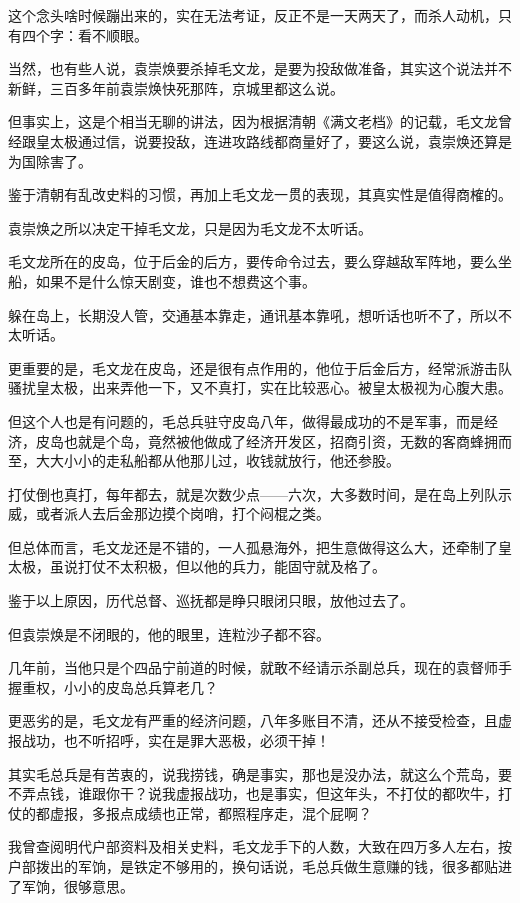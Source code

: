 \begin{multicols}{\theparacolNo}
		这个念头啥时候蹦出来的，实在无法考证，反正不是一天两天了，而杀人动机，只有四个字：看不顺眼。

		当然，也有些人说，袁崇焕要杀掉毛文龙，是要为投敌做准备，其实这个说法并不新鲜，三百多年前袁崇焕快死那阵，京城里都这么说。

		但事实上，这是个相当无聊的讲法，因为根据清朝《满文老档》的记载，毛文龙曾经跟皇太极通过信，说要投敌，连进攻路线都商量好了，要这么说，袁崇焕还算是为国除害了。

		鉴于清朝有乱改史料的习惯，再加上毛文龙一贯的表现，其真实性是值得商榷的。

		袁崇焕之所以决定干掉毛文龙，只是因为毛文龙不太听话。

		毛文龙所在的皮岛，位于后金的后方，要传命令过去，要么穿越敌军阵地，要么坐船，如果不是什么惊天剧变，谁也不想费这个事。

		躲在岛上，长期没人管，交通基本靠走，通讯基本靠吼，想听话也听不了，所以不太听话。

		更重要的是，毛文龙在皮岛，还是很有点作用的，他位于后金后方，经常派游击队骚扰皇太极，出来弄他一下，又不真打，实在比较恶心。被皇太极视为心腹大患。

		但这个人也是有问题的，毛总兵驻守皮岛八年，做得最成功的不是军事，而是经济，皮岛也就是个岛，竟然被他做成了经济开发区，招商引资，无数的客商蜂拥而至，大大小小的走私船都从他那儿过，收钱就放行，他还参股。

		打仗倒也真打，每年都去，就是次数少点——六次，大多数时间，是在岛上列队示威，或者派人去后金那边摸个岗哨，打个闷棍之类。

		但总体而言，毛文龙还是不错的，一人孤悬海外，把生意做得这么大，还牵制了皇太极，虽说打仗不太积极，但以他的兵力，能固守就及格了。

		鉴于以上原因，历代总督、巡抚都是睁只眼闭只眼，放他过去了。

		但袁崇焕是不闭眼的，他的眼里，连粒沙子都不容。

		几年前，当他只是个四品宁前道的时候，就敢不经请示杀副总兵，现在的袁督师手握重权，小小的皮岛总兵算老几？

		更恶劣的是，毛文龙有严重的经济问题，八年多账目不清，还从不接受检查，且虚报战功，也不听招呼，实在是罪大恶极，必须干掉！

		其实毛总兵是有苦衷的，说我捞钱，确是事实，那也是没办法，就这么个荒岛，要不弄点钱，谁跟你干？说我虚报战功，也是事实，但这年头，不打仗的都吹牛，打仗的都虚报，多报点成绩也正常，都照程序走，混个屁啊？

		我曾查阅明代户部资料及相关史料，毛文龙手下的人数，大致在四万多人左右，按户部拨出的军饷，是铁定不够用的，换句话说，毛总兵做生意赚的钱，很多都贴进了军饷，很够意思。


\end{multicols}
